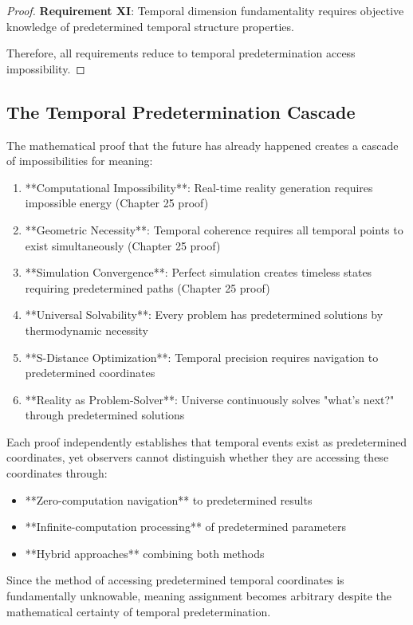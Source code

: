 \documentclass[12pt,a4paper]{article}
\begin{document}
{{\begin{proof}
\textbf{Requirement XI}: Temporal dimension fundamentality requires objective knowledge of predetermined temporal structure properties.

Therefore, all requirements reduce to temporal predetermination access impossibility.
\end{proof}

\subsection{The Temporal Predetermination Cascade}

The mathematical proof that the future has already happened creates a cascade of impossibilities for meaning:

\begin{enumerate}
\item **Computational Impossibility**: Real-time reality generation requires impossible energy (Chapter 25 proof)
\item **Geometric Necessity**: Temporal coherence requires all temporal points to exist simultaneously (Chapter 25 proof)  
\item **Simulation Convergence**: Perfect simulation creates timeless states requiring predetermined paths (Chapter 25 proof)
\item **Universal Solvability**: Every problem has predetermined solutions by thermodynamic necessity
\item **S-Distance Optimization**: Temporal precision requires navigation to predetermined coordinates
\item **Reality as Problem-Solver**: Universe continuously solves "what's next?" through predetermined solutions
\end{enumerate}

Each proof independently establishes that temporal events exist as predetermined coordinates, yet observers cannot distinguish whether they are accessing these coordinates through:

\begin{itemize}
\item **Zero-computation navigation** to predetermined results
\item **Infinite-computation processing** of predetermined parameters  
\item **Hybrid approaches** combining both methods
\end{itemize}

Since the method of accessing predetermined temporal coordinates is fundamentally unknowable, meaning assignment becomes arbitrary despite the mathematical certainty of temporal predetermination.

}}
\end{document}
